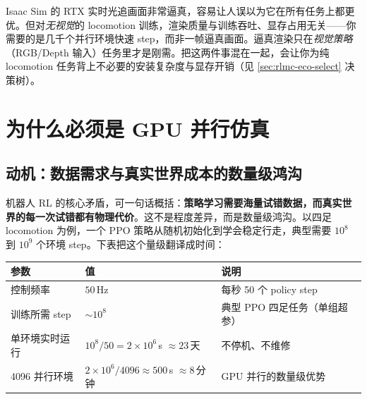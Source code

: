 \begin{pitfall}
Isaac Sim 的 RTX 实时光追画面非常逼真，容易让人误以为它在所有任务上都更优。但对\emph{无视觉}的 locomotion 训练，渲染质量与训练吞吐、显存占用无关——你需要的是几千个并行环境快速 step，而非一帧逼真画面。逼真渲染只在\emph{视觉策略}（RGB/Depth 输入）任务里才是刚需。把这两件事混在一起，会让你为纯 locomotion 任务背上不必要的安装复杂度与显存开销（见 \cref{sec:rlmc-eco-select} 决策树）。
\end{pitfall}

\begin{practice}[练习·三角色]
\end{practice}

\section{为什么必须是 GPU 并行仿真}
\label{sec:rlmc-eco-gpu}

\subsection{动机：数据需求与真实世界成本的数量级鸿沟}

机器人 RL 的核心矛盾，可一句话概括：\textbf{策略学习需要海量试错数据，而真实世界的每一次试错都有物理代价}。这不是程度差异，而是数量级鸿沟。以四足 locomotion 为例，一个 PPO 策略从随机初始化到学会稳定行走，典型需要 $10^8$ 到 $10^9$ 个环境 step。下表把这个量级翻译成时间：

\begin{center}
\small
\begin{tabular}{@{}lll@{}}
\toprule
参数 & 值 & 说明 \\
\midrule
控制频率 & $50\,$Hz & 每秒 50 个 policy step \\
训练所需 step & $\sim 10^8$ & 典型 PPO 四足任务（单组超参） \\
单环境实时运行 & $10^8/50=2\times10^6\,$s $\approx 23\,$天 & 不停机、不维修 \\
4096 并行环境 & $2\times10^6/4096\approx 500\,$s $\approx 8\,$分钟 & GPU 并行的数量级优势 \\
\bottomrule
\end{tabular}
\end{center}

